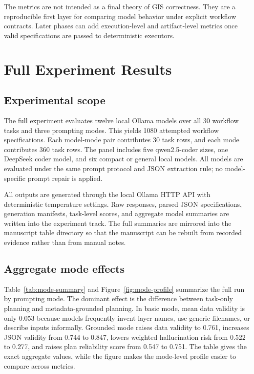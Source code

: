 \documentclass[]{interact}
\begin{document}
The metrics are not intended as a final theory of GIS correctness. They are a reproducible first layer for comparing model behavior under explicit workflow contracts. Later phases can add execution-level and artifact-level metrics once valid specifications are passed to deterministic executors.

\section{Full Experiment Results}

\subsection{Experimental scope}

The full experiment evaluates twelve local Ollama models over all 30 workflow tasks and three prompting modes. This yields 1080 attempted workflow specifications. Each model-mode pair contributes 30 task rows, and each mode contributes 360 task rows. The panel includes five qwen2.5-coder sizes, one DeepSeek coder model, and six compact or general local models. All models are evaluated under the same prompt protocol and JSON extraction rule; no model-specific prompt repair is applied.

All outputs are generated through the local Ollama HTTP API with deterministic temperature settings. Raw responses, parsed JSON specifications, generation manifests, task-level scores, and aggregate model summaries are written into the experiment track. The full summaries are mirrored into the manuscript table directory so that the manuscript can be rebuilt from recorded evidence rather than from manual notes.

\subsection{Aggregate mode effects}

Table~\ref{tab:mode-summary} and Figure~\ref{fig:mode-profile} summarize the full run by prompting mode. The dominant effect is the difference between task-only planning and metadata-grounded planning. In basic mode, mean data validity is only 0.053 because models frequently invent layer names, use generic filenames, or describe inputs informally. Grounded mode raises data validity to 0.761, increases JSON validity from 0.744 to 0.847, lowers weighted hallucination risk from 0.522 to 0.277, and raises plan reliability score from 0.547 to 0.751. The table gives the exact aggregate values, while the figure makes the mode-level profile easier to compare across metrics.
\end{document}
